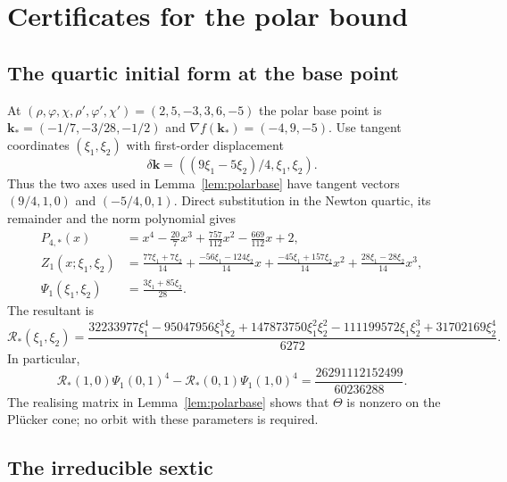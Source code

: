 \documentclass[11pt]{article}
\theoremstyle{definition}
\theoremstyle{remark}
\begin{document}
\section{Certificates for the polar bound}\label{app:polarcertificates}

\subsection{The quartic initial form at the base point}

At $(\rho,\varphi,\chi,\rho',\varphi',\chi')=(2,5,-3,3,6,-5)$ the polar base point is
$\mathbf k_*=(-1/7,-3/28,-1/2)$ and $\nabla f(\mathbf k_*)=(-4,9,-5)$.
Use tangent coordinates $(\xi_1,\xi_2)$ with first-order displacement
\[
 \delta\mathbf k=((9\xi_1-5\xi_2)/4,\xi_1,\xi_2).
\]
Thus the two axes used in Lemma~\ref{lem:polarbase} have tangent vectors
$(9/4,1,0)$ and $(-5/4,0,1)$. Direct substitution in the Newton quartic,
its remainder and the norm polynomial gives
\begin{align*}
 P_{4,*}(x)&=x^4-\frac{20}{7}x^3+\frac{757}{112}x^2
                         -\frac{669}{112}x+2,\\
 Z_1(x;\xi_1,\xi_2)&=\frac{77\xi_1+7\xi_2}{14}
       +\frac{-56\xi_1-124\xi_2}{14}x
       +\frac{-45\xi_1+157\xi_2}{14}x^2
       +\frac{28\xi_1-28\xi_2}{14}x^3,\\
 \Psi_1(\xi_1,\xi_2)&=\frac{3\xi_1+85\xi_2}{28}.
\end{align*}
The resultant is
\[
 \mathcal R_*(\xi_1,\xi_2)=\frac{
 32233977\xi_1^4-95047956\xi_1^3\xi_2+147873750\xi_1^2\xi_2^2
             -111199572\xi_1\xi_2^3+31702169\xi_2^4}{6272}.
\]
In particular,
\[
 \mathcal R_*(1,0)\Psi_1(0,1)^4-\mathcal R_*(0,1)\Psi_1(1,0)^4
 =\frac{26291112152499}{60236288}.
\]
The realising matrix in Lemma~\ref{lem:polarbase} shows that $\Theta$ is
nonzero on the Pl\"ucker cone; no orbit with these parameters is required.

\subsection{The irreducible sextic}
\end{document}
